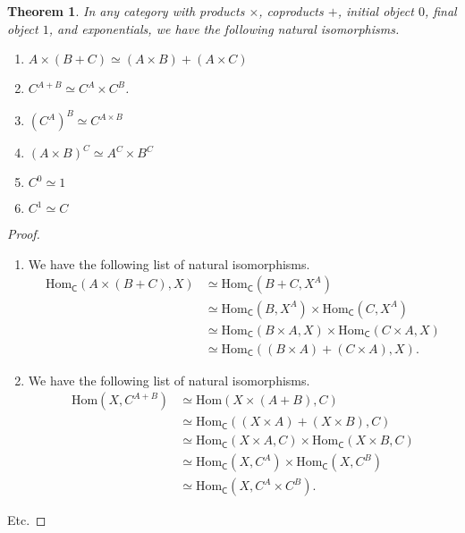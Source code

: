 \documentclass[a4paper]{report}
\newcommand{\Hom}{\mathrm{Hom}}
\theoremstyle{definition}
\theoremstyle{plain}
\newtheorem{theorem}{Theorem}[section]
\theoremstyle{remark}
\begin{document}
\begin{theorem}
  In any category with products $\times$, coproducts $+$, initial object $0$, final object $1$, and exponentials, we have the following natural isomorphisms.
  \begin{enumerate}
    \item $A \times (B + C) \simeq (A \times B) + (A \times C)$
    \item $C^{A + B} \simeq C^{A} \times C^{B}$.
    \item $(C^{A})^{B} \simeq C^{A \times B}$
    \item $(A \times B)^{C} \simeq A^{C} \times B^{C}$
    \item $C^{0} \simeq 1$
    \item $C^{1} \simeq C$
  \end{enumerate}
\end{theorem}
\begin{proof}
  $\,$
  \begin{enumerate}
    \item We have the following list of natural isomorphisms.
      \begin{align*}
        \Hom_{\mathsf{C}}(A \times (B + C), X) & \simeq \Hom_{\mathsf{C}}(B + C, X^{A}) \\
        & \simeq \Hom_{\mathsf{C}}(B, X^{A}) \times \Hom_{\mathsf{C}}(C, X^{A}) \\
        & \simeq \Hom_{\mathsf{C}}(B \times A, X) \times \Hom_{\mathsf{C}}(C \times A, X) \\
        & \simeq \Hom_{\mathsf{C}}((B \times A) + (C \times A), X).
      \end{align*}
    \item We have the following list of natural isomorphisms.
      \begin{align*}
        \Hom(X, C^{A + B}) & \simeq \Hom(X \times (A + B), C) \\
        & \simeq \Hom_{\mathsf{C}}((X \times A) + (X \times B), C) \\
        & \simeq \Hom_{\mathsf{C}}(X \times A, C) \times \Hom_{\mathsf{C}}(X \times B, C) \\
        & \simeq \Hom_{\mathsf{C}}(X, C^{A}) \times \Hom_{\mathsf{C}}(X, C^{B}) \\
        & \simeq \Hom_{\mathsf{C}}(X, C^{A} \times C^{B}).
      \end{align*}
  \end{enumerate}
  Etc.
\end{proof}
\end{document}
